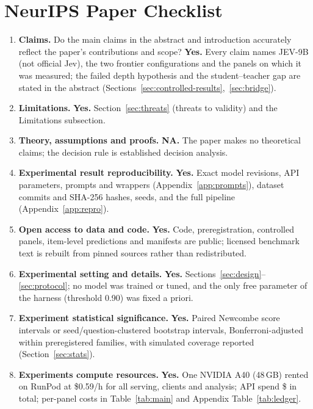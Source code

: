 \section*{NeurIPS Paper Checklist}
\small

\begin{enumerate}[leftmargin=1.4em,itemsep=3pt]
\item \textbf{Claims.} Do the main claims in the abstract and introduction accurately reflect the paper's contributions and scope?
\textbf{Yes.} Every claim names JEV-9B (not official Jev), the two frontier configurations and the panels on which it was measured; the failed depth hypothesis and the student--teacher gap are stated in the abstract (Sections~\ref{sec:controlled-results},~\ref{sec:bridge}).

\item \textbf{Limitations.} \textbf{Yes.} Section~\ref{sec:threats} (threats to validity) and the Limitations subsection.

\item \textbf{Theory, assumptions and proofs.} \textbf{NA.} The paper makes no theoretical claims; the decision rule is established decision analysis.

\item \textbf{Experimental result reproducibility.} \textbf{Yes.} Exact model revisions, API parameters, prompts and wrappers (Appendix~\ref{app:prompts}), dataset commits and SHA-256 hashes, seeds, and the full pipeline (Appendix~\ref{app:repro}).

\item \textbf{Open access to data and code.} \textbf{Yes.} Code, preregistration, controlled panels, item-level predictions and manifests are public; licensed benchmark text is rebuilt from pinned sources rather than redistributed.

\item \textbf{Experimental setting and details.} \textbf{Yes.} Sections~\ref{sec:design}--\ref{sec:protocol}; no model was trained or tuned, and the only free parameter of the harness (threshold 0.90) was fixed a priori.

\item \textbf{Experiment statistical significance.} \textbf{Yes.} Paired Newcombe score intervals or seed/question-clustered bootstrap intervals, Bonferroni-adjusted within preregistered families, with simulated coverage reported (Section~\ref{sec:stats}).

\item \textbf{Experiments compute resources.} \textbf{Yes.} One NVIDIA A40 (48\,GB) rented on RunPod at \$0.59/h for all serving, clients and analysis; API spend \$\ApiTotal{} in total; per-panel costs in Table~\ref{tab:main} and Appendix Table~\ref{tab:ledger}.


\end{enumerate}
